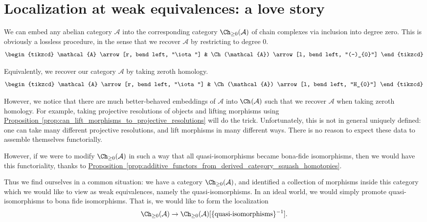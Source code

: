 \documentclass[main.tex]{subfiles}
\begin{document}
\section{Localization at weak equivalences: a love story}
\label{sec:localization_at_weak_equivalences_a_love_story}

We can embed any abelian category $\mathcal{A}$ into the corresponding category $\Ch_{\geq 0}(\mathcal{A})$ of chain complexes via inclusion into degree zero. This is obviously a lossless procedure, in the sense that we recover $\mathcal{A}$ by restricting to degree $0$.
\begin{equation*}
  \begin{tikzcd}
    \mathcal{A}
    \arrow[r, bend left, "\iota"]
    & \Ch(\mathcal{A})
    \arrow[l, bend left, "(-)_{0}"]
  \end{tikzcd}
\end{equation*}

Equivalently, we recover our category $\mathcal{A}$ by taking zeroth homology.
\begin{equation*}
  \begin{tikzcd}
    \mathcal{A}
    \arrow[r, bend left, "\iota"]
    & \Ch(\mathcal{A})
    \arrow[l, bend left, "H_{0}"]
  \end{tikzcd}
\end{equation*}

However, we notice that there are much better-behaved embeddings of $\mathcal{A}$ into $\Ch_{}(\mathcal{A})$ such that we recover $\mathcal{A}$ when taking zeroth homology. For example, taking projective resolutions of objects and lifting morphisms using \hyperref[prop:can_lift_morphisms_to_projective_resolutions]{Proposition~\ref*{prop:can_lift_morphisms_to_projective_resolutions}} will do the trick. Unfortunately, this is not in general uniquely defined: one can take many different projective resolutions, and lift morphisms in many different ways. There is no reason to expect these data to assemble themselves functorially.

However, if we were to modify $\Ch_{\geq 0}(\mathcal{A})$ in such a way that all quasi-isomorphisms became bona-fide isomorphisms, then we would have this functoriality, thanks to \hyperref[prop:additive_functors_from_derived_category_squash_homotopies]{Proposition~\ref*{prop:additive_functors_from_derived_category_squash_homotopies}}.

Thus we find ourselves in a common situation: we have a category $\Ch_{\geq 0}(\mathcal{A})$, and identified a collection of morphisms inside this category which we would like to view as weak equivalences, namely the quasi-isomorphisms. In an ideal world, we would simply promote quasi-isomorphisms to bona fide isomorphisms. That is, we would like to form the localization
\begin{equation*}
  \Ch_{\geq 0}(\mathcal{A}) \to \Ch_{\geq 0}(\mathcal{A})[\{\text{quasi-isomorphisms}\}^{-1}].
\end{equation*}
\end{document}
